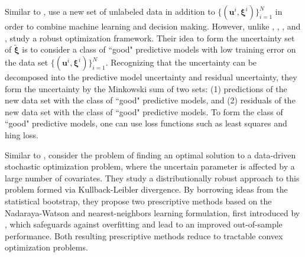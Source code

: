\documentclass[final,onefignum,onetabnum]{class}
\newcommand{\bs}[1]{\boldsymbol{#1}} %
\newcommand{\txi}{\tilde{\bs{\xi}}}
\begin{document}
Similar  to \citet{tulabandhula2013ML}, \citet{tulabandhula2014ML} use a new set of unlabeled data in addition to $\{(\bs{u}^{i},\bs{\xi}^{i})\}_{i=1}^{N}$ in order to combine machine learning and decision making. However, unlike \citet{bertsimas2018predictive}, \citet{deng2018LEO}, \citet{tulabandhula2013ML}, and \citet{tulabandhula2014combining}, \citet{tulabandhula2014ML} study a robust optimization framework. Their idea to  form the uncertainty set of $\txi$ is to consider a class of ``good" predictive models with low training error on the data set $\{(\bs{u}^{i},\bs{\xi}^{i})\}_{i=1}^{N}$. Recognizing that the uncertainty can be decomposed into the predictive model uncertainty and residual uncertainty, they form the uncertainty by the Minkowski sum of two sets: (1) predictions of the new data set with the class of ``good" predictive models, and (2) residuals of the new data set with the class of ``good" predictive models. To form the class of ``good" predictive models, one can use loss functions such as least squares and hing loss. 


Similar to \citet{bertsimas2018predictive}, \citet{bertsimas2017} consider the problem of finding an optimal solution to a data-driven stochastic optimization problem, where the uncertain parameter is affected by a large number of covariates. They study a distributionally robust approach to this problem formed via Kullback-Leibler divergence. By borrowing ideas from the statistical bootstrap, they propose two  prescriptive methods
based on the Nadaraya-Watson and nearest-neighbors learning formulation, first introduced by \citet{bertsimas2018predictive}, which safeguards against overfitting and lead to an improved out-of-sample performance. Both resulting prescriptive methods reduce to tractable convex optimization problems. 
\end{document}
